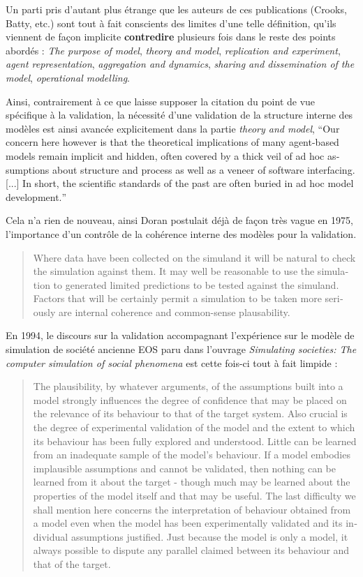 Un parti pris d'autant plus étrange que les auteurs de ces publications (Crooks, Batty, etc.) sont tout à fait conscients des limites d'une telle définition, qu'ils viennent de façon implicite \textbf{contredire} plusieurs fois dans le reste des points abordés : \textit{The purpose of model}, \textit{theory and model}, \textit{replication and experiment}, \textit{agent representation}, \textit{aggregation and dynamics}, \textit{sharing and dissemination of the model}, \textit{operational modelling}.

Ainsi, contrairement à ce que laisse supposer la citation du point de vue spécifique à la validation, la nécessité d'une validation de la structure interne des modèles est ainsi avancée explicitement dans la partie \textit{theory and model}, \foreignquote{english}{Our concern here however is that the theoretical implications of many agent-based models remain implicit and hidden, often covered by a thick veil of ad hoc assumptions about structure and process as well as a veneer of software interfacing. [...] In short, the scientific standards of the past are often buried in ad hoc model development.}

Cela n'a rien de nouveau, ainsi Doran postulait déjà de façon très vague en 1975, l'importance d'un contrôle de la cohérence interne des modèles pour la validation.

\foreignblockquote{english}{Where data have been collected on the simuland it will be natural to check the simulation against them. It may well be reasonable to use the simulation to generated limited predictions to be tested against the simuland. Factors that will be certainly permit a simulation to be taken more seriously are internal coherence and common-sense plausability.}

En 1994, le discours sur la validation accompagnant l'expérience sur le modèle de simulation de société ancienne EOS paru dans l'ouvrage \textit{Simulating societies: The computer simulation of social phenomena} est cette fois-ci tout à fait limpide :

\foreignblockquote{english}[{\cite[10-12]{Doran1994}}]{The plausibility, by whatever arguments, of the assumptions built into a model strongly influences the degree of confidence that may be placed on the relevance of its behaviour to that of the target system. Also crucial is the degree of experimental validation of the model and the extent to which its behaviour has been fully explored and understood. Little can be learned from an inadequate sample of the model's behaviour. If a model embodies implausible assumptions and cannot be validated, then nothing can be learned from it about the target - though much may be learned about the properties of the model itself and that may be useful. The last difficulty we shall mention here concerns the interpretation of behaviour obtained from a model even when the model has been experimentally validated and its individual assumptions justified. Just because the model is only a model, it always possible to dispute any parallel claimed between its behaviour and that of the target.}

